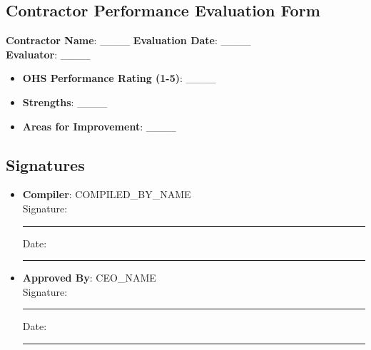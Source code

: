 \documentclass[11pt]{article}
\newcommand{\compilerName}{{{COMPILED_BY_NAME}}}
\begin{document}
\subsection*{Contractor Performance Evaluation Form}

\textbf{Contractor Name}: \_\_\_\_ \textbf{Evaluation Date}: \_\_\_\_ \\
\textbf{Evaluator}: \_\_\_\_

\begin{itemize}
    \item \textbf{OHS Performance Rating (1-5)}: \_\_\_\_
    \item \textbf{Strengths}: \_\_\_\_
    \item \textbf{Areas for Improvement}: \_\_\_\_
\end{itemize}

\subsection*{Signatures}
\begin{itemize}
  \item \textbf{Compiler}: \compilerName \\
    Signature: \rule{5cm}{0.4pt} \quad Date: \rule{3cm}{0.4pt}
  \item \textbf{Approved By}: {{CEO_NAME}} \\
    Signature: \rule{5cm}{0.4pt} \quad Date: \rule{3cm}{0.4pt}
\end{itemize}
\end{document}
